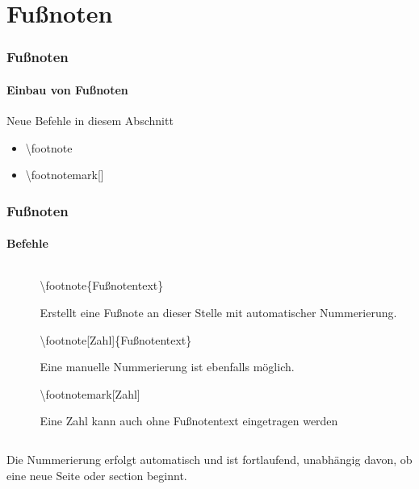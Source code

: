 \section{Fu\ss noten}

\begin{frame}
\frametitle{Fu\ss noten}
\framesubtitle{Einbau von Fu\ss noten}
\begin{block}{Neue Befehle in diesem Abschnitt}
\begin{itemize}
\item \color{nounibaredI}\textbackslash footnote
\item \textbackslash footnotemark\color{nounibagreenI}[]\color{black}
\end{itemize}
\end{block}
\end{frame}


\begin{frame}
\frametitle{Fu\ss noten}
\framesubtitle{Befehle}
\begin{columns}
\begin{column}{0.5\textwidth}
\begin{ttfamily}\scriptsize

\end{ttfamily}
\end{column}
\begin{column}{0.5\textwidth}
\begin{ttfamily}\color{nounibaredI}\textbackslash footnote\color{black}\{Fu\ss notentext\}\end{ttfamily} Erstellt eine Fußnote an dieser Stelle mit automatischer Nummerierung.

\begin{ttfamily}\color{nounibaredI}\textbackslash footnote\color{nounibagreenI}[Zahl]\color{black}\{Fu\ss notentext\}\end{ttfamily} Eine manuelle Nummerierung ist ebenfalls möglich.

\begin{ttfamily}\color{nounibaredI}\textbackslash footnotemark\color{nounibagreenI}[Zahl]\color{black}\end{ttfamily}
Eine Zahl kann auch ohne Fußnotentext eingetragen werden
\end{column}
\end{columns}
\bigskip
Die Nummerierung erfolgt automatisch und ist fortlaufend, unabhängig davon, ob
eine neue Seite oder {\ttfamily section} beginnt.
\end{frame}